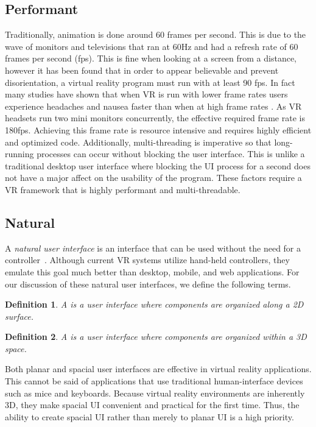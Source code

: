 \documentclass[conference,12pt]{IEEEtran}
\newtheorem{definition}{Definition}
\begin{document}
\subsection{Performant}\label{sec:performant}
Traditionally, animation is done around 60 frames per second.  This is due to the 
wave of monitors and televisions that ran at 60Hz and had a refresh rate of 
60 frames per second (fps).  This is fine when looking at a screen from a distance, 
however it has been found that in order to appear believable and prevent 
disorientation, a virtual reality program must run with at least 90 fps. 
In fact many studies have shown that when VR is run with lower frame rates
users experience headaches and nausea faster than when at high frame rates
\cite{irisVR}. As VR headsets run two mini monitors concurrently, the effective 
required frame rate is 180fps.  Achieving this frame rate is resource intensive 
and requires highly efficient and optimized code. Additionally, multi-threading 
is imperative so that long-running processes can occur without blocking the user
interface. This is unlike a traditional desktop user interface where blocking
the UI process for a second does not have a major affect on the usability of the
program. These factors require a VR framework that is highly performant and
multi-threadable.

\subsection{Natural}\label{sec:natural}
A \textit{natural user interface} is an interface that can be used without the
need for a controller~\cite{Wimmers:2015:VR:Natural-UI}. Although current VR
systems utilize hand-held controllers, they emulate this goal much better than
desktop, mobile, and web applications. For our discussion of these natural user
interfaces, we define the following terms.

\begin{definition}\label{def:planar-ui}
    A {\normalfont{}} is a user interface where components are
    organized along a 2D surface.
\end{definition}

\begin{definition}\label{def:spacial-ui}
    A {\normalfont{}} is a user interface where components are
    organized within a 3D space.
\end{definition}

Both planar and spacial user interfaces are effective in virtual reality
applications. This cannot be said of applications that use traditional
human-interface devices such as mice and keyboards. Because virtual reality
environments are inherently 3D, they make spacial UI convenient and practical
for the first time. Thus, the ability to create spacial UI rather than merely to
planar UI is a high priority.
\end{document}

